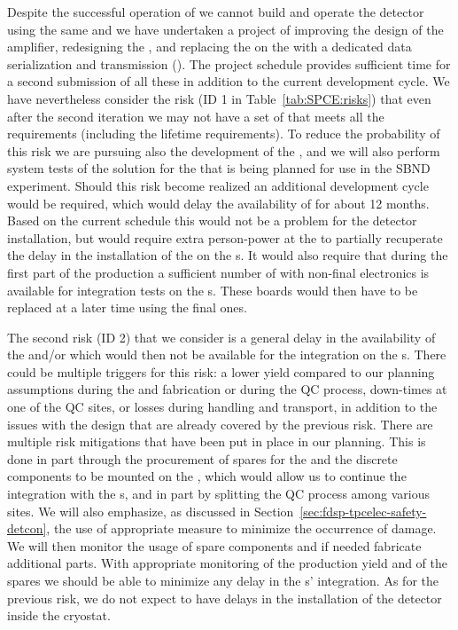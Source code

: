 Despite the successful operation of  we cannot build and operate
the   detector using the same  and we have
undertaken a project of improving the design of the  amplifier, redesigning
the , and replacing the  on the  with a dedicated data
serialization and transmission  (). The project schedule provides
sufficient time for a second submission of all these  in addition
to the current development cycle. We have nevertheless consider the risk (ID 1
in Table~\ref{tab:SPCE:risks}) that even after the second iteration 
we may not have a set of  that meets all the  requirements
(including the lifetime requirements). To reduce the probability of this 
risk we are pursuing also the development of the  , and we
will also perform system tests of the  solution for the  that is being
planned for use in the SBND experiment. Should this risk become realized an
additional development cycle would be required, which would delay the availability
of  for about 12 months. Based on the current schedule this would
not be a problem for the detector installation, but would require extra 
person-power at the  to partially recuperate the delay in the
installation of the  on the s. It would also require
that during the first part of the  production a sufficient number
of  with non-final electronics is available for integration tests
on the s. These boards would then have to be replaced at a later
time using the final ones.

The second risk (ID 2) that we consider is a general delay in the availability of the 
and/or  which would then not be available for the integration
on the s. There could be multiple triggers for this risk: a lower yield 
compared to our planning assumptions during the  and  
fabrication or during the QC process, down-times at one of the QC sites, or losses during 
handling and transport, in addition to the issues with the design that are already 
covered by the previous risk. There are multiple risk mitigations that have been
put in place in our planning. This is done in part through the procurement of
spares for the  and the discrete components to be mounted on the
, which would allow us to continue the integration with the s,
and in part by splitting the QC process among various sites. We will also emphasize,
as discussed in Section~\ref{sec:fdsp-tpcelec-safety-detcon}, the use of appropriate
measure to minimize the occurrence of  damage. We will then monitor the usage
of spare components and if needed fabricate additional parts. With appropriate
monitoring of the production yield and of the spares we should be able to minimize
any delay in the s' integration. As for the previous risk, we
do not expect to have delays in the installation of the detector inside the cryostat.
 
